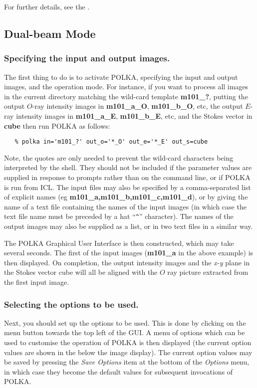 For further details, see the .

\subsection {Dual-beam Mode}

\subsubsection {Specifying the input and output images.}
The first thing to do is to activate POLKA, specifying the input and
output images, and the operation mode. For instance, if you
want to process all images in the current directory matching the wild-card 
template {\bf m101\_?}, putting the output $O$-ray intensity images
in {\bf m101\_a\_O}, {\bf m101\_b\_O}, etc, the output $E$-ray intensity
images in {\bf m101\_a\_E}, {\bf m101\_b\_E}, etc, and the Stokes vector
in {\bf cube} then run POLKA as follows:

\begin{verbatim}
   % polka in='m101_?' out_o='*_O' out_e='*_E' out_s=cube
\end{verbatim}

Note, the quotes are only needed to prevent the wild-card characters
being interpreted by the shell. They should not be included if the
parameter values are supplied in response to prompts rather than on the
command line, or if POLKA is run from ICL. The input files may also be
specified by a comma-separated list of explicit names (eg {\bf
m101\_a,m101\_b,m101\_c,m101\_d}), or by giving the name of a text file
containing the names of the input images (in which case the text file
name must be preceded by a hat ``\verb+^+'' character). The names of the
output images may also be supplied as a list, or in two text files in a 
similar way.

The POLKA Graphical User Interface is then constructed, which may take
several seconds. The first of the input images ({\bf m101\_a} in the
above example) is then displayed. On completion, the output intensity
images and the {\em x-y} plane in the Stokes vector cube will all be
aligned with the $O$ ray picture extracted from the first input image.

\subsubsection {Selecting the options to be used.}
Next, you should set up the options to be used. This is done by clicking
on the  menu button towards
the top left of the GUI. A menu of options which can be used to customise
the operation of POLKA is then displayed (the current option values are 
shown in the  below the image 
display). The current option values may be saved by pressing the {\em
Save Options} item at the bottom of the {\em Options} menu, in which case
they become the default values for subsequent invocations of POLKA.

